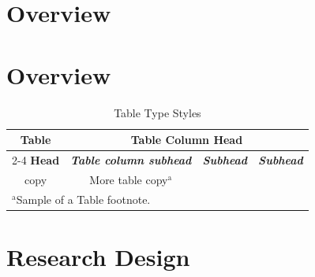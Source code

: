 \documentclass{thesis-library}
\begin{document}
\section{Overview}
\lipsum[16]

\section{Overview}
\lipsum[17-18]

\begin{table}[!ht] %
\caption[Table Names Displayed in the List of Tables]{Table Type Styles}
\begin{center}
\begin{tabular}{|c|c|c|c|}
\hline
\textbf{Table}&\multicolumn{3}{|c|}{\textbf{Table Column Head}} \\
\cline{2-4} 
\textbf{Head} & \textbf{\textit{Table column subhead}}& \textbf{\textit{Subhead}}& \textbf{\textit{Subhead}} \\
\hline
copy& More table copy$^{\mathrm{a}}$& &  \\
\hline
\multicolumn{4}{l}{$^{\mathrm{a}}$Sample of a Table footnote.}
\end{tabular}
\label{tab1}
\end{center}
\end{table}

\section{Research Design}
\lipsum[19-20]
\end{document}
